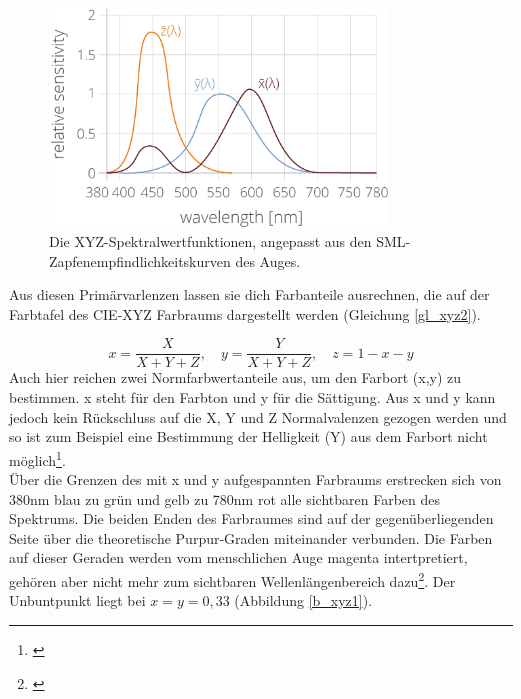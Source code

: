 \begin{figure}[H]     %
\centering
\includegraphics[width=0.8\textwidth]{bilder/xyz2} 
\caption {Die XYZ-Spektralwertfunktionen, angepasst aus den SML-Zapfenempfindlichkeitskurven des Auges.\protect\footnotemark}\label{b_xyz2}
\end{figure}
 
Aus diesen Primärvarlenzen lassen sie dich Farbanteile ausrechnen, die auf der Farbtafel des CIE-XYZ Farbraums dargestellt werden (Gleichung \ref{gl_xyz2}). 

\begin{equation}\label{gl_xyz2}
		x = \frac{X}{X+Y+Z},\quad y = \frac{Y}{X+Y+Z},\quad z = 1-x-y
\end{equation}
Auch hier reichen zwei Normfarbwertanteile aus, um den Farbort (x,y) zu bestimmen. x steht für den Farbton und y für die Sättigung. Aus x und y kann jedoch kein Rückschluss auf die X, Y und Z Normalvalenzen gezogen werden und so ist zum Beispiel eine Bestimmung der Helligkeit (Y) aus dem Farbort nicht möglich\footnote{\cite[79]{greule}}.\\
Über die Grenzen des mit x und y aufgespannten Farbraums erstrecken sich von 380nm blau zu grün und gelb zu 780nm rot alle sichtbaren Farben des Spektrums. Die beiden Enden des Farbraumes sind auf der gegenüberliegenden Seite über die theoretische Purpur-Graden miteinander verbunden. Die Farben auf dieser Geraden werden vom menschlichen Auge magenta intertpretiert, gehören aber nicht mehr zum sichtbaren Wellenlängenbereich dazu\footnote{\cite[73]{mueller}}. Der Unbuntpunkt liegt bei $x=y=0,33$ (Abbildung \ref{b_xyz1}).

